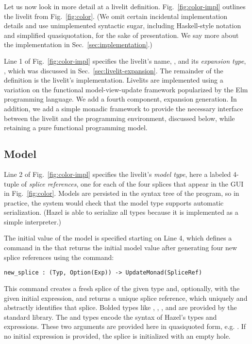 \noindent
Let us now look in more detail at a livelit definition. Fig.~\ref{fig:color-impl}
outlines the  livelit from Fig.~\ref{fig:color}. (We omit certain 
incidental implementation details and use unimplemented syntactic sugar, including
Haskell-style  notation and simplified quasiquotation, for the sake of presentation.
We say more about the implementation in Sec.~\ref{sec:implementation}.)

Line 1 of Fig.~\ref{fig:color-impl} specifies the livelit's name, , and its \emph{expansion type},
, which was discussed in Sec.~\ref{sec:livelit-expansion}.
The remainder of the definition is the livelit's implementation.
Livelits are implemented using a variation on the functional model-view-update
framework popularized by the Elm programming language. We add a fourth component,
expansion generation. In addition, we add a simple monadic framework to provide the necessary  
interface between the livelit and the programming environment, discussed below, while retaining
a pure functional programming model.

\subsection{Model}\label{sec:model}
Line 2 of Fig.~\ref{fig:color-impl} specifies the livelit's \emph{model type},
here a labeled 4-tuple of \emph{splice references}, one for each of the four splices
that appear in the GUI in Fig.~\ref{fig:color}.
Models are persisted in the syntax tree of the program, so in practice,
 the system would check that the model type supports automatic serialization. 
 (Hazel is able to serialize all types because it is implemented as a 
 simple interpreter.)

The initial value of the model is specified starting on Line 4, 
which defines a command in the  that returns the 
initial model value after generating four new splice references
using the  command:
\begin{lstlisting}[numbers=none]
  new_splice : (Typ, Option(Exp)) -> UpdateMonad(SpliceRef)
\end{lstlisting}
This command creates a fresh splice
of the given type and, optionally, with the given initial expression,
and returns a unique splice reference, which uniquely and abstractly identifies that splice.
Bolded types like , , , and 
are provided by the standard library. The  and  types 
encode the syntax of Hazel's types and expressions.
These two arguments are provided here in quasiquoted form, e.g. . 
If no initial expression is provided, the splice is initialized with 
an empty hole.

